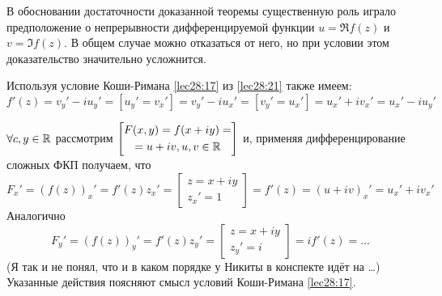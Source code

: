 \documentclass[../../main.tex]{subfiles}
\begin{document}
	
\begin{rems}
	\item В обосновании достаточности доказанной теоремы существенную роль 
	играло предположение о непрерывности дифференцируемой функции 
	$ u = \Re f(z) $ и $ v = \Im f(z) $. В общем случае  можно отказаться 
	от него, но при условии этом доказательство значительно усложнится.
	\item Используя условие Коши-Римана \eqref{lec28:17} из \eqref{lec28:21} 
	также имеем:
	\begin{equation}
	\label{lec29:22} 
	f'(z) = v_y' - iu_y' = \left[u_y' = v_x'\right] =
	v_y' - iu_x' = \left[v_y' = u_x'\right] = u_x' + iv_x' = u_x' - iu_y'
	\end{equation}
	\item $ \forall c, y \in \mathbb{R} $ рассмотрим 
	$ \left[\begin{gathered}
		F(x, y) = f(x + iy) =\\
		=u + iv, u, v \in \mathbb{R}
	\end{gathered}\right] $ 
	и, применяя дифференцирование сложных ФКП получаем, что 
	\[ 
	F_x' = (f(z))_x' = f'(z)z_x' = \left[
	\begin{gathered}
		z = x + iy\\
		z_x' = 1
	\end{gathered}
	\right] = f'(z) = (u + iv)_x' = u_x' + iv_x'
	\]
	Аналогично
	\[ 
	F_y' = (f(z))_y' = f'(z)z_y' = \left[
	\begin{gathered}
	z = x + iy\\
	z_y' = i
	\end{gathered}
	\right] = if'(z) = \dots
	\]
	(Я так и не понял, что и в каком порядке у Никиты в конспекте идёт на \dots)
	Указанные действия поясняют смысл условий Коши-Римана \eqref{lec28:17}.
\end{rems}
\end{document}
